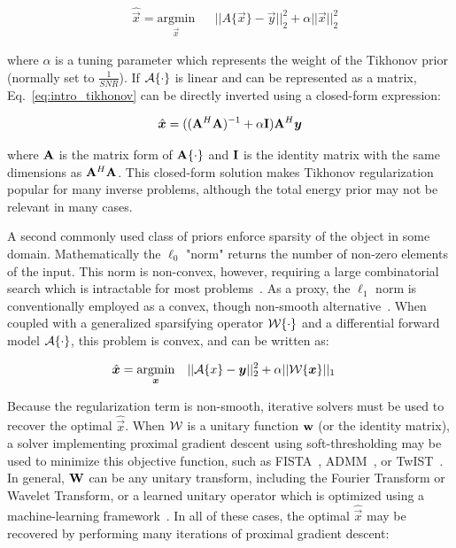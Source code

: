 \begin{equation}\label{eq:intro_tikhonov}
\begin{aligned}
& \hat{\vec{x}} = \underset{\vec{x}}{\text{argmin}}
& & ||A\{\vec{x}\}-\vec{y} ||_2^2 + \alpha||\vec{x}||_2^2
\end{aligned}
\end{equation}

\noindent where $\alpha$ is a tuning parameter which represents the weight of the Tikhonov prior (normally set to $\frac{1}{SNR}$). If $\mathcal{A}\{\cdot\}$ is linear and can be represented as a matrix, Eq.~\ref{eq:intro_tikhonov} can be directly inverted using a closed-form expression:

\begin{equation}
    \hat{\bm{x}} = ((\mathbf{A}^H \mathbf{A})^{-1} + \alpha \mathbf{I})\mathbf{A}^H \bm{y}
\end{equation}

\noindent where $\mathbf{A}$ is the matrix form of $\mathbf{A}\{\cdot\}$ and $\mathbf{I}$ is the identity matrix with the same dimensions as $\mathbf{A}^H \mathbf{A}$. This closed-form solution makes Tikhonov regularization popular for many inverse problems, although the total energy prior may not be relevant in many cases.

A second commonly used class of priors enforce sparsity of the object in some domain. Mathematically the $\ell_0$ "norm" returns the number of non-zero elements of the input. This norm is non-convex, however, requiring a large combinatorial search which is intractable for most problems~\cite{candes2008enhancing}. As a proxy, the $\ell_1$ norm is conventionally employed as a convex, though non-smooth alternative~\cite{taylor1979deconvolution}. When coupled with a generalized sparsifying operator $\mathcal{W}\{\cdot\}$ and a differential forward model $\mathcal{A}\{\cdot\}$, this problem is convex, and can be written as:

\begin{equation}\label{eq:intro_sparse}
\begin{aligned}
& \hat{\bm{x}} = \underset{\bm{x}}{\text{argmin}}
& & ||\mathcal{A}\{x\}-\bm{y} ||_2^2 + \alpha||\mathcal{W}\{\bm{x}\}||_1
\end{aligned}
\end{equation}

Because the regularization term is non-smooth, iterative solvers must be used to recover the optimal $\hat{\vec{x}}$. When $\mathcal{W}$ is a unitary function $\mathbf{w}$ (or the identity matrix), a solver implementing proximal gradient descent using soft-thresholding may be used to minimize this objective function, such as FISTA~\cite{beck2009fast}, ADMM~\cite{boyd2011distributed}, or TwIST~\cite{bioucas2007new}. In general, $\mathbf{W}$ can be any unitary transform, including the Fourier Transform or Wavelet Transform, or a learned unitary operator which is optimized using a machine-learning framework~\cite{ravishankar2013learning}. In all of these cases, the optimal $\hat{\vec{x}}$ may be recovered by performing many iterations of proximal gradient descent:

